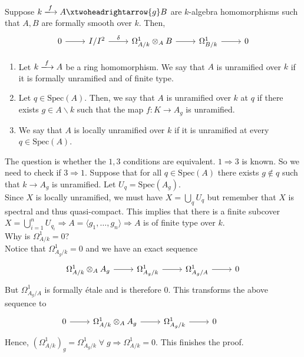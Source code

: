 \documentclass[oneside, 12pt, ]{scrbook}
\newcommand{\spec}{\mathrm{Spec}}
\newcommand{\bs}{\backslash}
\newcommand{\ds}{\displaystyle}
\theoremstyle{theorem}
\begin{document}
\begin{corollary}
Suppose $k \xlongrightarrow{f} A \xtwoheadrightarrow{g} B$ are $k$-algebra homomorphisms such that $A,B$ are formally smooth over $k$. Then,
\[\begin{tikzcd} 
	0 & {I/I^2} & {\Omega_{A/k}^{1} \otimes_{A} B} & {\Omega_{B/k}^{1}} & 0
	\arrow[from=1-1, to=1-2]
	\arrow["\delta", from=1-2, to=1-3]
	\arrow[from=1-3, to=1-4]
	\arrow[from=1-4, to=1-5]
\end{tikzcd}\]
\end{corollary}

\begin{definition}
\begin{enumerate}
\item Let $k \xlongrightarrow{f}A$ be a ring homomorphism. We say that $A$ is unramified over $k$ if it is formally unramified and of finite type.
\item Let $q\in \spec(A)$. Then, we say that $A$ is unramified over $k$ at $q$ if there exists $g\in A\bs k$ such that the map $f: K \rightarrow A_{g}$ is unramified.
\item We say that $A$ is locally unramified over $k$ if it is unramified at every $q\in \spec(A)$.
\end{enumerate}
\end{definition}

The question is whether the $1,3$ conditions are equivalent. $1\Rightarrow 3$ is known. So we need to check if $3 \Rightarrow 1$. Suppose that for all $q \in \spec(A)$ there exists $g \not \in q$ such that $k \rightarrow A_{g}$ is unramified. Let $U_{q} = \spec(A_{g})$. \\
Since $X$ is locally unramified, we must have $X = \ds{\bigcup_{q} U_{q}}$ but remember that $X$ is spectral and thus quasi-compact. This implies that there is a finite subcover $X = \ds{\bigcup_{i=1}^n U_{q_{i}}} \Rightarrow A = \langle g_{1} , \hdots , g_{n} \rangle \Rightarrow A$ is of finite type over $k$. \\

Why is $\Omega_{A/k}^1 = 0$?\\

Notice that $\Omega_{A_{g}/k}^{1} =0$ and we have an exact sequence
\[\begin{tikzcd}
	{\Omega_{A/k}^{1} \otimes_{A} A_{g}} & {\Omega_{A_{g}/k}^{1}} & {\Omega_{A_{g}/A}^{1}} & 0
	\arrow[from=1-1, to=1-2]
	\arrow[from=1-2, to=1-3]
	\arrow[from=1-3, to=1-4]
\end{tikzcd}\]
But $\Omega_{A_{g}/A}^{1}$ is formally \'{e}tale and is therefore $0$. This transforms the above sequence to 
\[\begin{tikzcd}
	0 & {\Omega_{A/k}^{1} \otimes_{A} A_{g}} & {\Omega_{A_{g}/k}^{1}} & 0 & {}
	\arrow[from=1-2, to=1-3]
	\arrow[from=1-3, to=1-4]
	\arrow[from=1-1, to=1-2]
\end{tikzcd}\]
Hence, $(\Omega_{A/k}^1)_{g} = \Omega_{A_{g}/k}^{1} \; \forall \; g \Rightarrow \Omega_{A/k}^{1} =0$. This finishes the proof.
\end{document}
